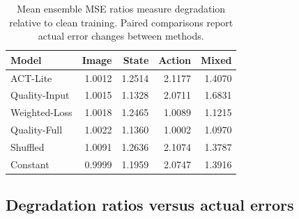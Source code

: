 \documentclass[11pt,a4paper]{article}
\begin{document}
\begin{table}[H]\centering\small\begin{tabular}{lrrrr}\toprule
Model & Image & State & Action & Mixed\\\midrule
ACT-Lite & 1.0012 & 1.2514 & 2.1177 & 1.4070\\
Quality-Input & 1.0015 & 1.1328 & 2.0711 & 1.6831\\
Weighted-Loss & 1.0018 & 1.2465 & 1.0089 & 1.1215\\
Quality-Full & 1.0022 & 1.1360 & 1.0002 & 1.0970\\
Shuffled & 1.0091 & 1.2636 & 2.1074 & 1.3787\\
Constant & 0.9999 & 1.1959 & 2.0747 & 1.3916\\
\bottomrule\end{tabular}\caption{Mean ensemble MSE ratios measure degradation relative to clean training. Paired comparisons report actual error changes between methods.}\end{table}
\clearpage\subsection{Degradation ratios versus actual errors}
\end{document}

